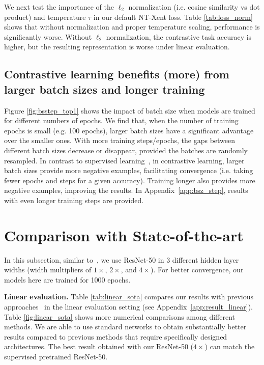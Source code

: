 We next test the importance of the $\ell_2$ normalization (i.e. cosine similarity vs dot product) and temperature $\tau$ in our default NT-Xent loss. Table \ref{tab:loss_norm} shows that without normalization and proper temperature scaling, performance is significantly worse. Without $\ell_2$ normalization, the contrastive task accuracy is higher, but the resulting representation is worse under linear evaluation.

\subsection{Contrastive learning benefits (more) from larger batch sizes and longer training}


Figure \ref{fig:bsstep_top1} shows the impact of batch size when models are trained for different numbers of epochs. We find that, when the number of training epochs is small (e.g. 100 epochs), larger batch sizes have a significant advantage over the smaller ones. With more training steps/epochs, the gaps between different batch sizes decrease or disappear, provided the batches are randomly resampled. In contrast to supervised learning~\cite{goyal2017accurate}, in contrastive learning, larger batch sizes provide more negative examples, facilitating convergence (i.e. taking fewer epochs and steps for a given accuracy). Training longer also provides more negative examples, improving the results. In Appendix~\ref{app:bsz_step}, results with even longer training steps are provided.

\section{Comparison with State-of-the-art} In this subsection, similar to~\citet{kolesnikov2019revisiting,he2019momentum}, we use ResNet-50 in 3 different hidden layer widths (width multipliers of $1\times$, $2\times$, and $4\times$). For better convergence, our models here are trained for 1000 epochs.

\textbf{Linear evaluation.} Table \ref{tab:linear_sota} compares our results with previous approaches~\cite{zhuang2019local,he2019momentum,misra2019self,henaff2019data,kolesnikov2019revisiting,donahue2019large,bachman2019learning,tian2019contrastive} in the linear evaluation setting (see Appendix~\ref{app:result_linear}). Table \ref{fig:linear_sota} shows more numerical comparisons among different methods. We are able to use standard networks to obtain substantially better results compared to previous methods that require specifically designed architectures. The best result obtained with our ResNet-50 ($4\times$) can match the supervised pretrained ResNet-50.

